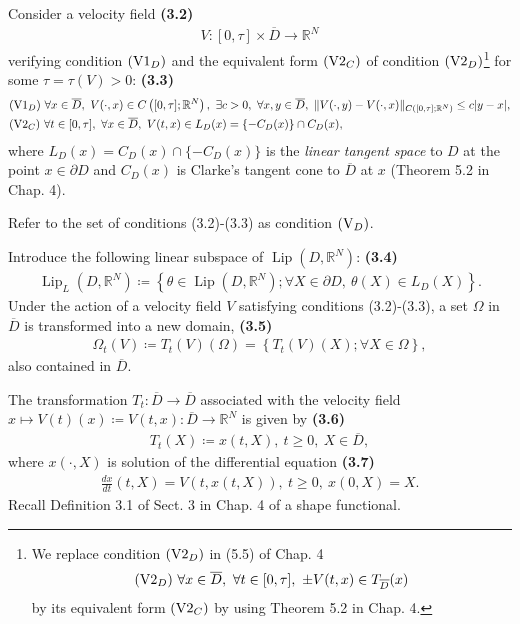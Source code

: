 \documentclass[oneside]{book}
\numberwithin{equation}{section}
\begin{document}
Consider a velocity field \textbf{(3.2)}
\begin{align*}
    V:[0,\tau]\times\overline{D}\to\mathbb{R}^N
\end{align*}
verifying condition $({\rm V1}_D)$ and the equivalent form $({\rm V2}_C)$ of condition $({\rm V2}_D)$\footnote{We replace condition $({\rm V2}_D)$ in (5.5) of Chap. 4
    \begin{align*}
        ({\rm V2}_D)\ \forall x\in\overline{D},\ \forall t\in[0,\tau],\ \pm V(t,x)\in T_{\overline{D}}(x)
    \end{align*}
    by its equivalent form $({\rm V2}_C)$ by using Theorem 5.2 in Chap. 4.} for some $\tau = \tau(V) > 0$: \textbf{(3.3)}
\begin{align*}
    &({\rm V1}_D)\ \forall x\in\overline{D},\ V(\cdot,x)\in C\left([0,\tau];\mathbb{R}^N\right),\ \exists c > 0,\ \forall x,y\in\overline{D},\ \|V(\cdot,y) - V(\cdot,x)\|_{C\left([0,\tau];\mathbb{R}^N\right)}\le c|y - x|,\\
    &({\rm V2}_C)\ \forall t\in[0,\tau],\ \forall x\in\overline{D},\ V(t,x)\in L_D(x) = \{-C_D(x)\}\cap C_D(x),
\end{align*}
where $L_D(x) = C_D(x)\cap\{-C_D(x)\}$ is the \textit{linear tangent space} to $D$ at the point $x\in\partial D$ and $C_D(x)$ is Clarke's tangent cone to $\overline{D}$ at $x$ (Theorem 5.2 in Chap. 4).

Refer to the set of conditions (3.2)-(3.3) as condition $({\rm V}_D)$.

%
Introduce the following linear subspace of $\operatorname{Lip}(D,\mathbb{R}^N)$: \textbf{(3.4)}
\begin{align*}
    \operatorname{Lip}_L(D,\mathbb{R}^N)\coloneqq\left\{\theta\in\operatorname{Lip}(D,\mathbb{R}^N);\forall X\in\partial D,\ \theta(X)\in L_D(X)\right\}.
\end{align*}
Under the action of a velocity field $V$ satisfying conditions (3.2)-(3.3), a set $\Omega$ in $\overline{D}$ is transformed into a new domain, \textbf{(3.5)}
\begin{align*}
    \Omega_t(V)\coloneqq T_t(V)(\Omega) = \left\{T_t(V)(X);\forall X\in\Omega\right\},
\end{align*}
also contained in $\overline{D}$.

The transformation $T_t:\overline{D}\to\overline{D}$ associated with the velocity field $x\mapsto V(t)(x)\coloneqq V(t,x):\overline{D}\to\mathbb{R}^N$ is given by \textbf{(3.6)}
\begin{align*}
    T_t(X)\coloneqq x(t,X),\ t\ge 0,\ X\in\overline{D},
\end{align*}
where $x(\cdot,X)$ is solution of the differential equation \textbf{(3.7)}
\begin{align*}
    \frac{dx}{dt}(t,X) = V\left(t,x(t,X)\right),\ t\ge 0,\ x(0,X) = X.
\end{align*}
Recall Definition 3.1 of Sect. 3 in Chap. 4 of a shape functional.
\end{document}
